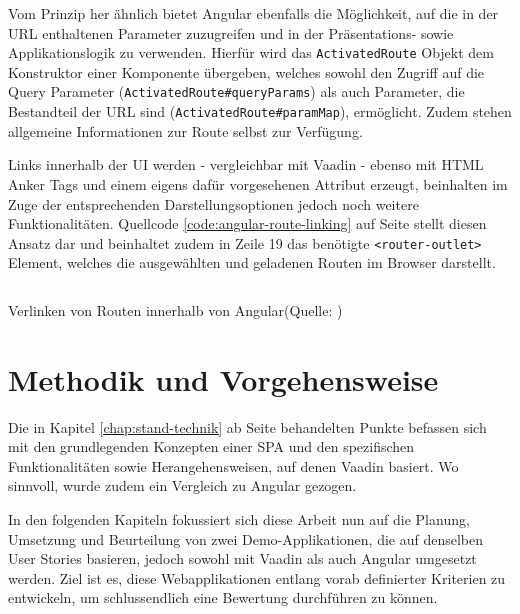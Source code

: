 \documentclass[a4paper,12pt,twoside]{scrreprt}
\begin{document}
Vom Prinzip her ähnlich bietet Angular ebenfalls die Möglichkeit, auf die in der URL enthaltenen Parameter zuzugreifen und in der Präsentations- sowie Applikationslogik zu verwenden. Hierfür wird das \texttt{ActivatedRoute} Objekt dem Konstruktor einer Komponente übergeben, welches sowohl den Zugriff auf die Query Parameter (\texttt{ActivatedRoute\#queryParams}) als auch Parameter, die Bestandteil der URL sind (\texttt{ActivatedRoute\#paramMap}), ermöglicht. Zudem stehen allgemeine Informationen zur Route selbst zur Verfügung. \parencite[][]{google_llc_angular_nodate}

\medskip

Links innerhalb der \acs{UI} werden - vergleichbar mit Vaadin - ebenso mit HTML Anker Tags und einem eigens dafür vorgesehenen Attribut erzeugt, beinhalten im Zuge der entsprechenden Darstellungsoptionen jedoch noch weitere Funktionalitäten. Quellcode \ref{code:angular-route-linking} auf Seite \pageref{code:angular-route-linking} stellt diesen Ansatz dar und beinhaltet zudem in Zeile 19 das benötigte \texttt{<router-outlet>} Element, welches die ausgewählten und geladenen Routen im Browser darstellt. \parencite[][]{google_llc_angular_nodate}

\begin{listing}[ht]
    \inputminted[fontsize=\footnotesize,linenos]{html}{code/Angular_Routing-tags.html}
    \caption[Verlinken von Routen innerhalb von Angular]{Verlinken von Routen innerhalb von Angular\newline(Quelle: \cite[][]{google_llc_angular_nodate})}
    \label{code:angular-route-linking}
\end{listing}

\chapter{Methodik und Vorgehensweise}
\label{chap:methodik-vorgehensweise}
Die in Kapitel \ref{chap:stand-technik} ab Seite \pageref{chap:stand-technik} behandelten Punkte befassen sich mit den grundlegenden Konzepten einer \ac{SPA} und den spezifischen Funktionalitäten sowie Herangehensweisen, auf denen Vaadin basiert. Wo sinnvoll, wurde zudem ein Vergleich zu Angular gezogen.

In den folgenden Kapiteln fokussiert sich diese Arbeit nun auf die Planung, Umsetzung und Beurteilung von zwei Demo-Applikationen, die auf denselben User Stories basieren, jedoch sowohl mit Vaadin als auch Angular umgesetzt werden. Ziel ist es, diese Webapplikationen entlang vorab definierter Kriterien zu entwickeln, um schlussendlich eine Bewertung durchführen zu können.
\end{document}
